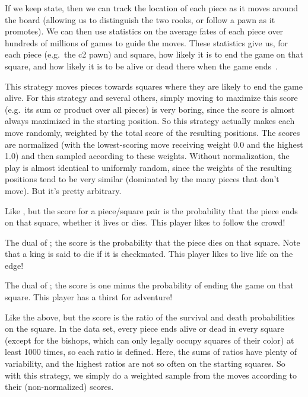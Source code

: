 \documentclass[10pt,preprint,twocolumn]{acmart}
\begin{document}
If we keep state, then we can track the location of each piece as it
moves around the board (allowing us to distinguish the two rooks, or
follow a pawn as it promotes). We can then use statistics on the
average fates of each piece over hundreds of millions of games to
guide the moves. These statistics give us, for each piece (e.g.~the c2
pawn) and square, how likely it is to end the game on that square, and
how likely it is to be alive or dead there when the game
ends~\cite{survival}.

 This strategy moves pieces towards squares where
they are likely to end the game alive. For this strategy and several
others, simply moving to maximize this score (e.g.~its sum or product
over all pieces) is very boring, since the score is almost always
maximized in the starting position. So this strategy actually makes
each move randomly, weighted by the total score of the resulting
positions. The scores are normalized (with the lowest-scoring move
receiving weight 0.0 and the highest 1.0) and then sampled according
to these weights. Without normalization, the play is almost identical
to uniformly random, since the weights of the resulting positions tend
to be very similar (dominated by the many pieces that don't move). But
it's pretty arbitrary.

 Like , but the score for a
piece/square pair is the probability that the piece ends on that
square, whether it lives or dies. This player likes to follow the
crowd!

 The dual of ; the score is
the probability that the piece dies on that square. Note that a
king is said to die if it is checkmated. This player likes to
live life on the edge!

 The dual of ; the score
is one minus the probability of ending the game on that square. This
player has a thirst for adventure!

 Like the above, but the score is the
ratio of the survival and death probabilities on the square. In the
data set, every piece ends alive or dead in every square (except
for the bishops, which can only legally occupy squares of their
color) at least 1000 times, so each ratio is defined. Here, the
sums of ratios have plenty of variability, and the highest
ratios are not so often on the starting squares. So with this
strategy, we simply do a weighted sample from the moves according
to their (non-normalized) scores.
\end{document}

